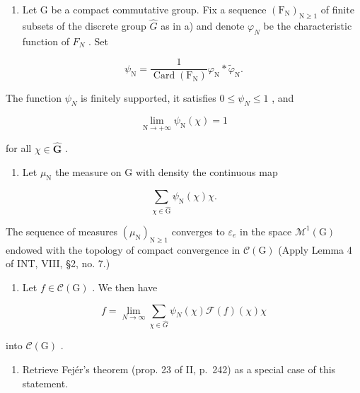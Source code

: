 \begin{enumerate}
\def\labelenumi{\alph{enumi})}
\setcounter{enumi}{1}
\tightlist
\item
  Let G be a compact commutative group. Fix a sequence \((\mathrm{F}_{\mathrm{N}})_{\mathrm{N}\geqslant1}\) of finite subsets of the discrete group \(\widehat{G}\) as in a) and denote \(\varphi_{N}\) be the characteristic function of \(F_{N}\) . Set
\end{enumerate}

\[
\psi_ {\mathrm{N}} = \frac {1}{\operatorname{Card} \left(\mathrm{F} _ {\mathrm{N}}\right)} \varphi_ {\mathrm{N}} * \widetilde {\varphi} _ {\mathrm{N}}.
\]

The function \(\psi_{N}\) is finitely supported, it satisfies \(0 \leqslant \psi_{N} \leqslant 1\) , and

\[
\lim _ {\mathrm{N} \to + \infty} \psi_ {\mathrm{N}} (\chi) = 1
\]

for all \(\chi\in\widehat{\mathbf{G}}\) .

\begin{enumerate}
\def\labelenumi{\alph{enumi})}
\setcounter{enumi}{2}
\tightlist
\item
  Let \(\mu_{\mathrm{N}}\) the measure on G with density the continuous map
\end{enumerate}

\[
\sum_ {\chi \in \widehat {\mathrm{G}}} \psi_ {\mathrm{N}} (\chi) \chi .
\]

The sequence of measures \((\mu_{\mathrm{N}})_{\mathrm{N}\geqslant1}\) converges to \(\varepsilon_{e}\) in the space \(\mathcal{M}^{1}(\mathrm{G})\) endowed with the topology of compact convergence in \(\mathcal{C}(\mathrm{G})\) (Apply Lemma 4 of INT, VIII, §2, no. 7.)

\begin{enumerate}
\def\labelenumi{\alph{enumi})}
\setcounter{enumi}{3}
\tightlist
\item
  Let \(f\in \mathcal{C}(\mathrm{G})\) . We then have
\end{enumerate}

\[
f = \lim _ {N \to \infty} \sum_ {\chi \in \widehat {G}} \psi_ {N} (\chi) \mathcal {F} (f) (\chi) \chi
\]

into \(\mathcal{C}(\mathrm{G})\) .

\begin{enumerate}
\def\labelenumi{\alph{enumi})}
\setcounter{enumi}{4}
\tightlist
\item
  Retrieve Fejér's theorem (prop. 23 of II, p.~242) as a special case of this statement.
\end{enumerate}

